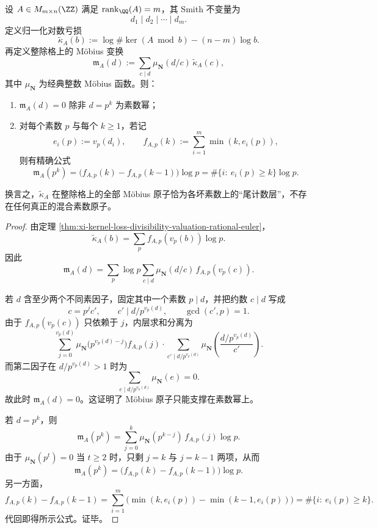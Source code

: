 \begin{theorem}\label{thm:conclusion-smith-loss-divisibility-mobius-atomization}
设 \(A\in M_{m\times n}(\ZZ)\) 满足 \(\operatorname{rank}_{\QQ}(A)=m\)，其 Smith 不变量为
\[
d_1\mid d_2\mid\cdots\mid d_m.
\]
定义归一化对数亏损
\[
\widetilde\kappa_A(b)
:=
\log \#\ker(A\bmod b)-(n-m)\log b.
\]
再定义整除格上的 Möbius 变换
\[
\mathfrak m_A(d)
:=
\sum_{c\mid d}\mu_{\mathbf N}(d/c)\,\widetilde\kappa_A(c),
\]
其中 \(\mu_{\mathbf N}\) 为经典整数 Möbius 函数。则：
\begin{enumerate}
  \item \(\mathfrak m_A(d)=0\) 除非 \(d=p^k\) 为素数幂；
  \item 对每个素数 \(p\) 与每个 \(k\ge 1\)，若记
  \[
  e_i(p):=v_p(d_i),
  \qquad
  f_{A,p}(k):=\sum_{i=1}^{m}\min(k,e_i(p)),
  \]
  则有精确公式
  \[
  \boxed{\;
  \mathfrak m_A(p^k)
  =
  \bigl(f_{A,p}(k)-f_{A,p}(k-1)\bigr)\log p
  =
  \#\{i:\ e_i(p)\ge k\}\log p.\;}
  \]
\end{enumerate}
换言之，\(\widetilde\kappa_A\) 在整除格上的全部 Möbius 原子恰为各坏素数上的“尾计数层”，不存在任何真正的混合素数原子。
\end{theorem}
\begin{proof}
由定理 \ref{thm:xi-kernel-loss-divisibility-valuation-rational-euler}，
\[
\widetilde\kappa_A(b)=\sum_{p} f_{A,p}(v_p(b))\log p.
\]
因此
\[
\mathfrak m_A(d)
=
\sum_{p}\log p
\sum_{c\mid d}\mu_{\mathbf N}(d/c)\,f_{A,p}(v_p(c)).
\]

若 \(d\) 含至少两个不同素因子，固定其中一个素数 \(p\mid d\)，并把约数 \(c\mid d\) 写成
\[
c=p^j c',
\qquad
c'\mid d/p^{v_p(d)},
\qquad
\gcd(c',p)=1.
\]
由于 \(f_{A,p}(v_p(c))\) 只依赖于 \(j\)，内层求和分离为
\[
\sum_{j=0}^{v_p(d)}
\mu_{\mathbf N}\!\bigl(p^{v_p(d)-j}\bigr)f_{A,p}(j)
\cdot
\sum_{c'\mid d/p^{v_p(d)}}\mu_{\mathbf N}\!\left(\frac{d/p^{v_p(d)}}{c'}\right).
\]
而第二因子在 \(d/p^{v_p(d)}>1\) 时为
\[
\sum_{e\mid d/p^{v_p(d)}}\mu_{\mathbf N}(e)=0.
\]
故此时 \(\mathfrak m_A(d)=0\)。这证明了 Möbius 原子只能支撑在素数幂上。

若 \(d=p^k\)，则
\[
\mathfrak m_A(p^k)
=
\sum_{j=0}^{k}\mu_{\mathbf N}(p^{k-j})\,f_{A,p}(j)\log p.
\]
由于 \(\mu_{\mathbf N}(p^t)=0\) 当 \(t\ge 2\) 时，只剩 \(j=k\) 与 \(j=k-1\) 两项，从而
\[
\mathfrak m_A(p^k)
=
\bigl(f_{A,p}(k)-f_{A,p}(k-1)\bigr)\log p.
\]
另一方面，
\[
f_{A,p}(k)-f_{A,p}(k-1)
=
\sum_{i=1}^{m}\bigl(\min(k,e_i(p))-\min(k-1,e_i(p))\bigr)
=
\#\{i:\ e_i(p)\ge k\}.
\]
代回即得所示公式。证毕。
\end{proof}


